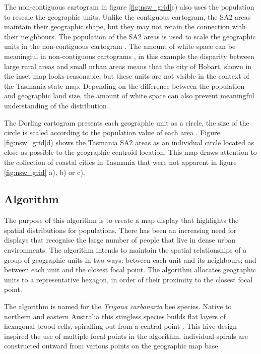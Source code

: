 The non-contiguous cartogram in figure \ref{fig:nsw_grid}c) also uses
the population to rescale the geographic units. Unlike the contiguous
cartogram, the SA2 areas maintain their geographic shape, but they may
not retain the connection with their neighbours. The population of the
SA2 areas is used to scale the geographic units in the non-contiguous
cartogram \citep{NAC}. The amount of white space can be meaningful in
non-contiguous cartograms \citep{ECGC}, in this example the disparity
between large rural areas and small urban areas means that the city of
Hobart, shown in the inset map looks reasonable, but these units are not
visible in the context of the Tasmania state map. Depending on the
difference between the population and geographic land size, the amount
of white space can also prevent meaningful understanding of the
distribution \citep{TVSSS}.

The Dorling cartogram presents each geographic unit as a circle, the
size of the circle is scaled according to the population value of each
area \citep{ACTUC}. Figure \ref{fig:nsw_grid}d) shows the Tasmania SA2
areas as an individual circle located as close as possible to the
geographic centroid location. This map draws attention to the collection
of coastal cities in Tasmania that were not apparent in figure
\ref{fig:nsw_grid} a), b) or c).

\hypertarget{algorithm}{%
\subsection{Algorithm}\label{algorithm}}

The purpose of this algorithm is to create a map display that highlights
the spatial distributions for populations. There has been an increasing
need for displays that recognise the large number of people that live in
dense urban environments. The algorithm intends to maintain the spatial
relationships of a group of geographic units in two ways: between each
unit and its neighbours; and between each unit and the closest focal
point. The algorithm allocates geographic units to a representative
hexagon, in order of their proximity to the closest focal point.

The algorithm is named for the \emph{Trigona carbonaria} bee species.
Native to northern and eastern Australia this stingless species builds
flat layers of hexagonal brood cells, spiralling out from a central
point \citep{PH}. This hive design inspired the use of multiple focal
points in the algorithm, individual spirals are constructed outward from
various points on the geographic map base.

